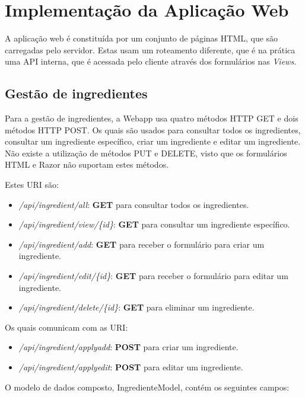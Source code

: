 \chapter{Implementação da Aplicação Web}

A aplicação web é constituída por um conjunto de páginas HTML, que são carregadas pelo servidor. Estas usam um roteamento diferente, que é na prática uma API interna, que é acessada pelo cliente através dos formulários nas \textit{Views}.

\section{Gestão de ingredientes}

Para a gestão de ingredientes, a Webapp usa quatro métodos HTTP GET e dois métodos HTTP POST. Os quais são usados para consultar todos os ingredientes, consultar um ingrediente específico, criar um ingrediente e editar um ingrediente. Não existe a utilização de métodos PUT e DELETE, visto que os formulários HTML e Razor não suportam estes métodos.

Estes URI são:

\begin{itemize}
  \item \textit{/api/ingredient/all}: \textbf{GET} para consultar todos os
  ingredientes.
  \item \textit{/api/ingredient/view/\{id\}}: \textbf{GET} para consultar um
  ingrediente específico.
  \item \textit{/api/ingredient/add}: \textbf{GET} para receber o formulário
  para criar um ingrediente.
  \item \textit{/api/ingredient/edit/\{id\}}: \textbf{GET} para receber o
  formulário para editar um ingrediente.
  \item \textit{/api/ingredient/delete/\{id\}}: \textbf{GET} para eliminar um
  ingrediente.
\end{itemize}

Os quais comunicam com as URI:

\begin{itemize}
  \item \textit{/api/ingredient/applyadd}: \textbf{POST} para criar um
  ingrediente.
  \item \textit{/api/ingredient/applyedit}: \textbf{POST} para editar um
  ingrediente.
\end{itemize}

O modelo de dados composto, IngredienteModel, contém os seguintes
campos:

